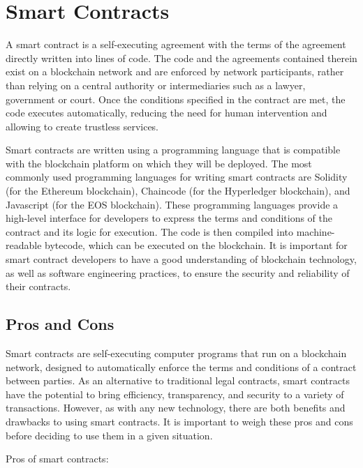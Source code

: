 \documentclass[target=mst,aauheader=]{thud}
\begin{document}
    \section{Smart Contracts}

    A smart contract is a self-executing agreement with the terms of the agreement directly written into lines of code. The code and the agreements contained therein exist on a blockchain network and are enforced by network participants, rather than relying on a central authority or intermediaries such as a lawyer, government or court. Once the conditions specified in the contract are met, the code executes automatically, reducing the need for human intervention and allowing to create trustless services.

    Smart contracts are written using a programming language that is compatible with the blockchain platform on which they will be deployed. The most commonly used programming languages for writing smart contracts are Solidity \cite{solidity} (for the Ethereum blockchain), Chaincode \cite{chaincode} (for the Hyperledger blockchain), and Javascript (for the EOS blockchain). These programming languages provide a high-level interface for developers to express the terms and conditions of the contract and its logic for execution. The code is then compiled into machine-readable bytecode, which can be executed on the blockchain. It is important for smart contract developers to have a good understanding of blockchain technology, as well as software engineering practices, to ensure the security and reliability of their contracts.

    \subsection{Pros and Cons}

    Smart contracts are self-executing computer programs that run on a blockchain network, designed to automatically enforce the terms and conditions of a contract between parties. As an alternative to traditional legal contracts, smart contracts have the potential to bring efficiency, transparency, and security to a variety of transactions. However, as with any new technology, there are both benefits and drawbacks to using smart contracts. It is important to weigh these pros and cons before deciding to use them in a given situation.
    
    Pros of smart contracts:
\end{document}
